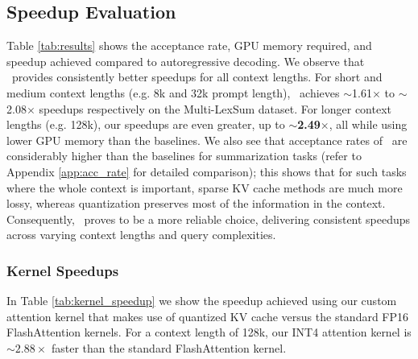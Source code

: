 \subsection{Speedup Evaluation}
\label{sec:speedup}
 Table \ref{tab:results} shows the acceptance rate, GPU memory required, and speedup achieved compared to autoregressive decoding. We observe that \OURS\ provides consistently better speedups for all context lengths. For short and medium context lengths (e.g. 8k and 32k prompt length), \OURS\ achieves $\sim$1.61$\times$ to $\sim$2.08$\times$ speedups respectively on the Multi-LexSum dataset. For longer context lengths (e.g. 128k), our speedups are even greater, up to $\sim$\textbf{2.49}$\times$, all while using lower GPU memory than the baselines. We also see that acceptance rates of \OURS\ are considerably higher than the baselines for summarization tasks (refer to Appendix \ref{app:acc_rate} for detailed comparison); this shows that for such tasks where the whole context is important, sparse KV cache methods are much more lossy, whereas quantization preserves most of the information in the context. Consequently, \OURS\ proves to be a more reliable choice, delivering consistent speedups across varying context lengths and query complexities.

\subsubsection{Kernel Speedups} \label{sec:kernel_speedups}
In Table \ref{tab:kernel_speedup} we show the speedup achieved using our custom attention kernel that makes use of quantized KV cache versus the standard FP16 FlashAttention kernels. For a context length of 128k, our INT4 attention kernel is $\sim2.88\times$ faster than the standard FlashAttention kernel.

\begin{table}[h!]
\centering
{}
\caption{Latency benchmark of our custom attention kernels for calculating attention with quantized hierarchical KV cache. QuantSpec INT4 refers to only loading the upper-4-bit, QuantSpec INT8 refers to loading both the upper and lower 4-bit. Benchmarked on kernel level.}
\label{tab:kernel_speedup}
\end{table}

